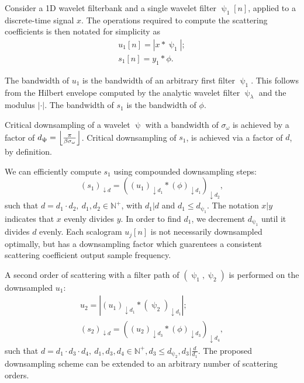 Consider a 1D wavelet filterbank and a single wavelet filter $\uppsi_1[n]$, applied to a discrete-time signal $x$. The operations required to compute the scattering coefficients is then notated for simplicity as
\begin{gather}
    u_1[n] = \left|  x * \uppsi_1   \right|; \\
    s_1[n] = y_1 * \phi.
\end{gather}

The bandwidth of $u_1$ is the bandwidth of an arbitrary first filter $\uppsi_1$. This follows from the Hilbert envelope computed by the analytic wavelet filter $\uppsi_\lambda$ and the modulus $|\cdot |$. The bandwidth of $s_1$ is the bandwidth of $\phi$.

Critical downsampling of a wavelet $\uppsi$ with a bandwidth of $\sigma_\omega$ is achieved by a factor of $d_{\uppsi} = \floor*{\frac{ \pi }{\beta\sigma_\omega}}$. Critical downsampling of $s_1$, is achieved via a factor of $d$, by definition.

We can efficiently compute $s_1$ using compounded downsampling steps:
\begin{equation}
    \left(s_1\right)_{\downarrow d} = \left( \left(u_1\right)_{\downarrow d_1} * (\phi)_{\downarrow d_1}\right)_{\downarrow d_2},
\end{equation}
such that $d = d_1 \cdot d_2, \ d_1, d_2 \in \mathbb{N}^+$, with $d_1 | d$ and $d_1 \le  d_{\uppsi_1}$. The notation $x | y$ indicates that $x$ evenly divides $y$. In order to find $d_1$, we decrement $d_{\uppsi_1}$ until it divides $d$ evenly. Each scalogram $u_j[n]$ is not necessarily downsampled optimally, but has a downsampling factor which guarentees a consistent scattering coefficient output sample frequency. 


A second order of scattering with a filter path of $(\uppsi_1, \uppsi_2)$ is performed on the downsampled $u_1$:
\begin{gather}
    u_2 = \left|  \left(u_1\right)_{\downarrow d_1} * (\uppsi_2)_{\downarrow d_1}  \right|; \\
    \left(s_2\right)_{\downarrow d} = \left( \left(u_2\right)_{\downarrow d_3} * (\phi)_{\downarrow d_3}\right)_{\downarrow d_4},
\end{gather}
such that $d = d_1 \cdot d_3 \cdot d_4, \ d_1, d_3, d_4 \in \mathbb{N}^+, d_3 \le d_{\uppsi_2}, d_3 | \frac{d}{d_1}$. The proposed downsampling scheme can be extended to an arbitrary number of scattering orders.



